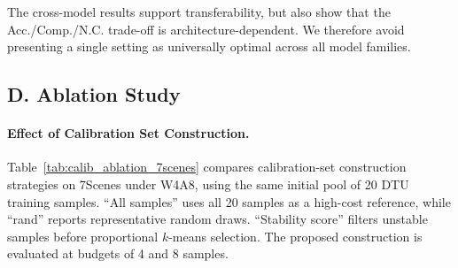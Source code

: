 \documentclass[journal]{Tail_Aware_Post_Training_Quantization_for_3D_Geometry_Models_TMM/IEEEtran}
\begin{document}
The cross-model results support transferability, but also show that the Acc./Comp./N.C. trade-off is architecture-dependent. We therefore avoid presenting a single setting as universally optimal across all model families.

\subsection{D. Ablation Study}

\paragraph{Effect of Calibration Set Construction.}
Table~\ref{tab:calib_ablation_7scenes} compares calibration-set construction strategies on 7Scenes under W4A8, using the same initial pool of 20 DTU training samples. ``All samples'' uses all 20 samples as a high-cost reference, while ``rand'' reports representative random draws. ``Stability score'' filters unstable samples before proportional $k$-means selection. The proposed construction is evaluated at budgets of 4 and 8 samples.
\end{document}
